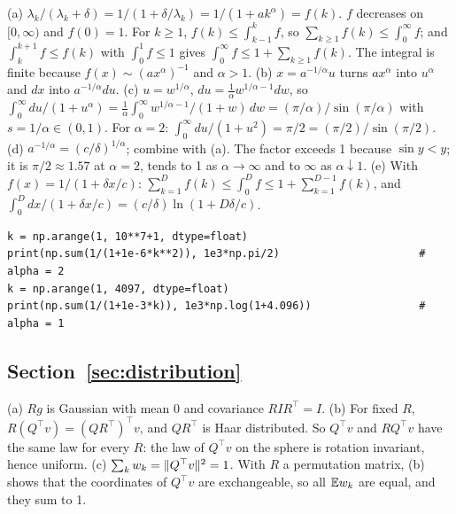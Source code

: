 (a) $\lambda_k/(\lambda_k+\delta)=1/(1+\delta/\lambda_k)=1/(1+ak^\alpha)=f(k)$. $f$ decreases on $[0,\infty)$ and
$f(0)=1$. For $k\ge1$, $f(k)\le\int_{k-1}^kf$, so $\sum_{k\ge1}f(k)\le\int_0^\infty f$; and $\int_k^{k+1}f\le f(k)$
with $\int_0^1f\le1$ gives $\int_0^\infty f\le1+\sum_{k\ge1}f(k)$. The integral is finite because
$f(x)\sim(ax^\alpha)^{-1}$ and $\alpha>1$.
\newline (b) $x=a^{-1/\alpha}u$ turns $ax^\alpha$ into $u^\alpha$ and $dx$ into $a^{-1/\alpha}du$.
\newline (c) $u=w^{1/\alpha}$, $du=\frac1\alpha w^{1/\alpha-1}dw$, so
$\int_0^\infty du/(1+u^\alpha)=\frac1\alpha\int_0^\infty w^{1/\alpha-1}/(1+w)\,dw=(\pi/\alpha)/\sin(\pi/\alpha)$ with
$s=1/\alpha\in(0,1)$. For $\alpha=2$: $\int_0^\infty du/(1+u^2)=\pi/2=(\pi/2)/\sin(\pi/2)$.
\newline (d) $a^{-1/\alpha}=(c/\delta)^{1/\alpha}$; combine with (a). The factor exceeds 1 because $\sin y<y$; it is
$\pi/2\approx1.57$ at $\alpha=2$, tends to 1 as $\alpha\to\infty$ and to $\infty$ as $\alpha\downarrow1$.
\newline (e) With $f(x)=1/(1+\delta x/c)$: $\sum_{k=1}^Df(k)\le\int_0^Df\le1+\sum_{k=1}^{D-1}f(k)$, and
$\int_0^Ddx/(1+\delta x/c)=(c/\delta)\ln(1+D\delta/c)$.

\begin{verbatim}
k = np.arange(1, 10**7+1, dtype=float)
print(np.sum(1/(1+1e-6*k**2)), 1e3*np.pi/2)                      # alpha = 2
k = np.arange(1, 4097, dtype=float)
print(np.sum(1/(1+1e-3*k)), 1e3*np.log(1+4.096))                 # alpha = 1
\end{verbatim}

\subsection*{Section~\ref{sec:distribution}}

(a) $Rg$ is Gaussian with mean 0 and covariance $RIR^\top=I$.
\newline (b) For fixed $R$, $R(Q^\top v)=(QR^\top)^\top v$, and $QR^\top$ is Haar distributed. So $Q^\top v$ and $RQ^\top v$
have the same law for every $R$: the law of $Q^\top v$ on the sphere is rotation invariant, hence uniform.
\newline (c) $\sum_kw_k=\lVert Q^\top v\rVert^2=1$. With $R$ a permutation matrix, (b) shows that the coordinates of $Q^\top v$ are
exchangeable, so all $\mathbb{E} w_k$ are equal, and they sum to 1.

